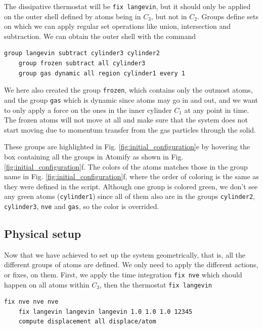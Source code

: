 \documentclass[aps,pre,twocolumn,letterpaper,floatfix,nofootinbib]{revtex4}
\newcommand{\code}[1]{\colorbox{light-gray}{\color{RawSienna}\texttt{#1}}}
\begin{document}
The dissipative thermostat will be \code{fix langevin}\citep{schneider1978molecular}, but it should only be applied on the outer shell defined by atoms being in $C_3$, but not in $C_2$.
Groups define sets on which we can apply regular set operations like union, intersection and subtraction.
We can obtain the outer shell with the command

\begin{lstlisting}[basicstyle=\tiny, frame = none, numbers=none, framexleftmargin=0pt, xleftmargin=-0.75cm, xrightmargin=0.0cm]
	group langevin subtract cylinder3 cylinder2
	group frozen subtract all cylinder3
	group gas dynamic all region cylinder1 every 1
\end{lstlisting}

We here also created the group \code{frozen}, which contains only the outmost atoms,
and the group \code{gas} which is dynamic since atoms may go in and out, and we want
to only apply a force on the ones in the inner cylinder $C_1$ at any point in time.
The frozen atoms will not move at all and make sure that the system does not start 
moving due to momentum transfer from the gas particles through the solid.

These groups are highlighted in Fig. \ref{fig:initial_configuration}e by hovering the box containing all the groups in Atomify as shown in Fig. \ref{fig:initial_configuration}f.
The colors of the atoms matches those in the group name in Fig. \ref{fig:initial_configuration}f, where the order of coloring is the same as they were defined in the script.
Although one group is colored green, we don't see any green atoms (\code{cylinder1}) since all of them also are in the groups \code{cylinder2}, \code{cylinder3}, \code{nve} and \code{gas},
so the color is overrided.

\subsection{Physical setup}
Now that we have achieved to set up the system geometrically, that is, all the different groups of atoms are defined.
We only need to apply the different actions, or fixes, on them.
First, we apply the time integration \code{fix nve} which should happen on all atoms within $C_3$, then the thermostat \code{fix langevin}

\begin{lstlisting}[basicstyle=\tiny, frame = none, numbers=none, framexleftmargin=0pt, xleftmargin=-0.75cm, xrightmargin=0.0cm]
	fix nve nve nve
	fix langevin langevin langevin 1.0 1.0 1.0 12345
	compute displacement all displace/atom
\end{lstlisting}
\end{document}
